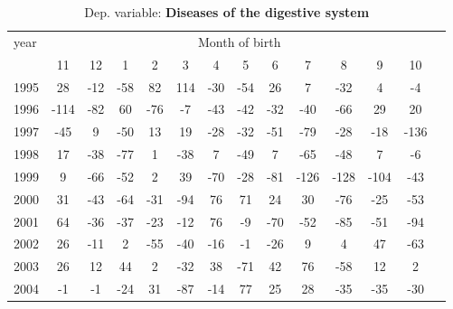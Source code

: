  \begin{table}[H] \begin{threeparttable} \centering \caption{Dep. variable: \textbf{Diseases of the digestive system}} {\def\sym#1{\ifmmode^{#1}\else\(^{#1}\)\fi} \begin{tabular}{l*{13}{c}} \toprule year & \multicolumn{12}{c}{Month of birth} \\ \cmidrule(lr){2-13} 
            &          11&          12&           1&           2&           3&           4&           5&           6&           7&           8&           9&          10\\
1995        &          28&         -12&         -58&          82&         114&         -30&         -54&          26&           7&         -32&           4&          -4\\
1996        &        -114&         -82&          60&         -76&          -7&         -43&         -42&         -32&         -40&         -66&          29&          20\\
1997        &         -45&           9&         -50&          13&          19&         -28&         -32&         -51&         -79&         -28&         -18&        -136\\
1998        &          17&         -38&         -77&           1&         -38&           7&         -49&           7&         -65&         -48&           7&          -6\\
1999        &           9&         -66&         -52&           2&          39&         -70&         -28&         -81&        -126&        -128&        -104&         -43\\
2000        &          31&         -43&         -64&         -31&         -94&          76&          71&          24&          30&         -76&         -25&         -53\\
2001        &          64&         -36&         -37&         -23&         -12&          76&          -9&         -70&         -52&         -85&         -51&         -94\\
2002        &          26&         -11&           2&         -55&         -40&         -16&          -1&         -26&           9&           4&          47&         -63\\
2003        &          26&          12&          44&           2&         -32&          38&         -71&          42&          76&         -58&          12&           2\\
2004        &          -1&          -1&         -24&          31&         -87&         -14&          77&          25&          28&         -35&         -35&         -30\\

\end{tabular}}
\end{threeparttable}
\end{table}

